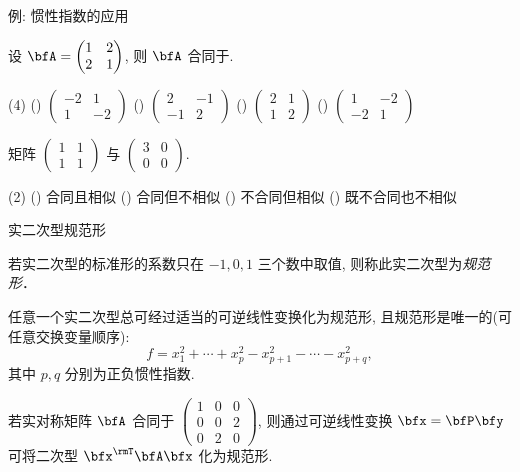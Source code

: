 \begin{frame}{例: 惯性指数的应用}
	\onslide<+->
	\begin{example}
		设 $\bfA=\begin{pmatrix}
			1&2\\2&1
		\end{pmatrix}$, 则 $\bfA$ 合同于.
		\begin{exchoice}(4)
			() $\begin{pmatrix}-2&1\\1&-2\end{pmatrix}$
			() $\begin{pmatrix}2&-1\\-1&2\end{pmatrix}$
			() $\begin{pmatrix}2&1\\1&2\end{pmatrix}$
			() $\begin{pmatrix}1&-2\\-2&1\end{pmatrix}$
		\end{exchoice}
	\end{example}
	\onslide<+->
	\begin{example}
		矩阵 $\begin{pmatrix}
			1&1\\1&1
		\end{pmatrix}$ 与 $\begin{pmatrix}
			3&0\\0&0
		\end{pmatrix}$\fillbraceframe{B}.
		\begin{exchoice}(2)
			() 合同且相似
			() 合同但不相似
			() 不合同但相似
			() 既不合同也不相似
		\end{exchoice}
	\end{example}
\end{frame}


\begin{frame}{实二次型规范形}
	\beqskip{3pt}
	\onslide<+->
	\begin{definition}
		若实二次型的标准形的系数只在 $-1, 0, 1$ 三个数中取值, 则称此实二次型为\emph{规范形}．
	\end{definition}
	\onslide<+->
	\begin{theorem}
		任意一个实二次型总可经过适当的可逆线性变换化为规范形, 且规范形是唯一的(可任意交换变量顺序):
		\[f=x_1^2+\cdots+x_p^2-x_{p+1}^2-\cdots-x_{p+q}^2,\]
		其中 $p,q$ 分别为正负惯性指数.
	\end{theorem}
	\onslide<+->
	\begin{example}
		若实对称矩阵 $\bfA$ 合同于 $\begin{pmatrix}
			1&0&0\\0&0&2\\0&2&0
		\end{pmatrix}$, 则通过可逆线性变换 $\bfx=\bfP\bfy$ 可将二次型 $\bfx^\rmT\bfA\bfx$ 化为规范形\fillblankframe[3cm][1pt]{$y_1^2+y_2^2-y_3^2$}.
	\end{example}
	\endgroup
\end{frame}


